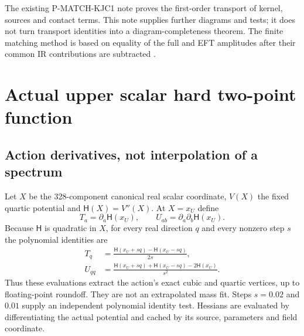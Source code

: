 \documentclass[11pt]{article}
\begin{document}
The existing P-MATCH-KJC1 note proves the first-order transport of
kernel, sources and contact terms. This note supplies further diagrams
and tests; it does not turn transport identities into a diagram-completeness
theorem. The finite matching method is based on equality of the full and
EFT amplitudes after their common IR contributions are subtracted
\cite{henning,scalar}.

\section{Actual upper scalar hard two-point function}
\subsection{Action derivatives, not interpolation of a spectrum}
Let $X$ be the 328-component canonical real scalar coordinate, $V(X)$ the
fixed quartic potential and $\mathsf H(X)=V''(X)$. At $X=x_U$ define
\begin{equation}
 T_a=\partial_a\mathsf H(x_U),\qquad
 U_{ab}=\partial_a\partial_b\mathsf H(x_U).
\end{equation}
Because $\mathsf H$ is quadratic in $X$, for every real direction $q$
and every nonzero step $s$ the polynomial identities are
\begin{align}
 T_q&=\frac{\mathsf H(x_U+s q)-\mathsf H(x_U-s q)}{2s},\\
 U_{qq}&=\frac{\mathsf H(x_U+s q)+\mathsf H(x_U-s q)
                       -2\mathsf H(x_U)}{s^2}.
 \label{eq:jets}
\end{align}
Thus these evaluations extract the action's exact cubic and quartic
vertices, up to floating-point roundoff. They are not an extrapolated
mass fit. Steps $s=0.02$ and $0.01$ supply an independent polynomial
identity test. Hessians are evaluated by differentiating the actual
potential and cached by its source, parameters and field coordinate.
\end{document}
